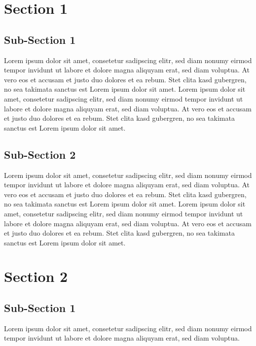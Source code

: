 \documentclass[12pt,a4paper,titlepage,oneside]{scrartcl}
\begin{document}
\maketitle
\setcounter{section}{0}
\setcounter{tocdepth}{2}
\tableofcontents

%
%

\section{Section 1}

\subsection{Sub-Section 1}
Lorem ipsum dolor sit amet, consetetur sadipscing elitr, sed diam nonumy eirmod tempor invidunt ut labore et dolore magna aliquyam erat, sed diam voluptua. At vero eos et accusam et justo duo dolores et ea rebum. Stet clita kasd gubergren, no sea takimata sanctus est Lorem ipsum dolor sit amet. Lorem ipsum dolor sit amet, consetetur sadipscing elitr, sed diam nonumy eirmod tempor invidunt ut labore et dolore magna aliquyam erat, sed diam voluptua. At vero eos et accusam et justo duo dolores et ea rebum. Stet clita kasd gubergren, no sea takimata sanctus est Lorem ipsum dolor sit amet.

\subsection{Sub-Section 2}
Lorem ipsum dolor sit amet, consetetur sadipscing elitr, sed diam nonumy eirmod tempor invidunt ut labore et dolore magna aliquyam erat, sed diam voluptua. At vero eos et accusam et justo duo dolores et ea rebum. Stet clita kasd gubergren, no sea takimata sanctus est Lorem ipsum dolor sit amet. Lorem ipsum dolor sit amet, consetetur sadipscing elitr, sed diam nonumy eirmod tempor invidunt ut labore et dolore magna aliquyam erat, sed diam voluptua. At vero eos et accusam et justo duo dolores et ea rebum. Stet clita kasd gubergren, no sea takimata sanctus est Lorem ipsum dolor sit amet.

\section{Section 2}

\subsection{Sub-Section 1}
Lorem ipsum dolor sit amet, consetetur sadipscing elitr, sed diam nonumy eirmod tempor invidunt ut labore et dolore magna aliquyam erat, sed diam voluptua.
\end{document}
